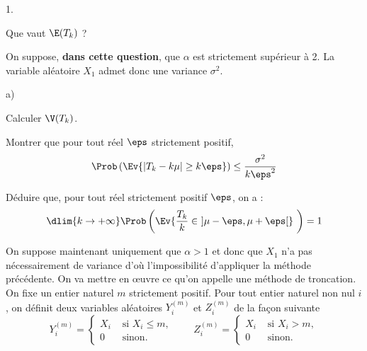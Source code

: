 \documentclass[11pt]{article}%
\begin{document}
\begin{noliste}{1.}
  \setlength{\itemsep}{4mm} %
  \setcounter{enumi}{6}
\item Que vaut $\E(T_{k})$ ? 
  
  




\item On suppose, \textbf{dans cette question}, que $\alpha$ est
  strictement supérieur à 2. La variable aléatoire $X_{1}$ admet donc
  une variance $\sigma^{2}$.
  \begin{noliste}{a)}
    \setlength{\itemsep}{2mm}
  \item Calculer $\V(T_{k})$.

    

  \item Montrer que pour tout réel $\eps$ strictement positif, 
    \[
    \Prob\left(\Ev{ |T_{k} - k\mu| \geq k \eps}\right) \leq
    \dfrac{\sigma^{2}}{k \eps^{2}}
    \]
    
    

    


  \item Déduire que, pour tout réel strictement positif $\eps$, on a :
    \[
    \dlim{k \to + \infty} \Prob\left(\Ev{\frac{T_{k}}{k} \in \ ] \mu -
        \eps, \mu + \eps[} \ \right) = 1
    \]

    
  \end{noliste}

\item On suppose maintenant uniquement que $\alpha >1$ et donc que
  $X_{1}$ n'a pas nécessairement de variance d'où l'impossibilité
  d'appliquer la méthode précédente. On va mettre en \oe{}uvre ce
  qu'on appelle une méthode de troncation.\\
  On fixe un entier naturel $m$ strictement positif. Pour tout entier
  naturel non nul $i$, on définit deux variables aléatoires
  $Y_{i}^{(m)}$ et $Z_{i}^{(m)}$ de la façon suivante
  \[
  Y_{i}^{(m)} = \left\{
    \begin{array}{cl}
      X_{i} & \text{ si } X_{i} \leq m, \\
      0 & \text{ sinon}.
    \end{array}
  \right. %
  \qquad %
  Z_{i}^{(m)} = %
  \left\{
    \begin{array}{cl}
      X_{i} & \text{ si } X_{i} > m, \\
      0 & \text{ sinon}.
    \end{array}
  \right.
  \]
\end{noliste}
\end{document}
